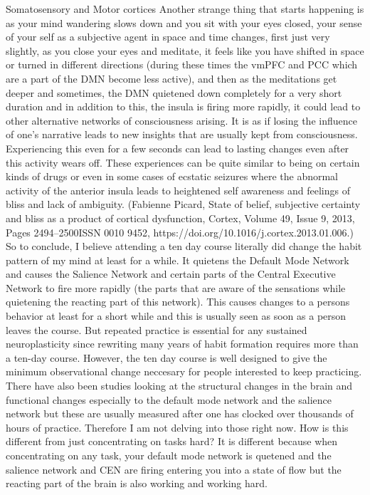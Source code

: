 \documentclass{article}
\begin{document}
Somatosensory and Motor cortices
Another strange thing that starts happening is as your mind wandering slows down and you sit with your eyes closed, your sense of your self as a subjective agent in space and time changes, first just very slightly, as you close your eyes and meditate, it feels like you have shifted in space or turned in different directions (during these times the vmPFC and PCC which are a part of the DMN become less active), and then as the meditations get deeper and sometimes, the DMN quietened down completely for a very short duration and in addition to this, the insula is firing more rapidly, it could lead to other alternative networks of consciousness arising. It is as if losing the influence of one’s narrative leads to new insights that are usually kept from consciousness. Experiencing this even for a few seconds can lead to lasting changes even after this activity wears off. These experiences can be quite similar to being on certain kinds of drugs or even in some cases of ecstatic seizures where the abnormal activity of the anterior insula leads to heightened self awareness and feelings of bliss and lack of ambiguity. (Fabienne Picard, State of belief, subjective certainty and bliss as a product of cortical dysfunction, Cortex, Volume 49, Issue 9, 2013,
Pages 2494–2500ISSN 0010 9452, https://doi.org/10.1016/j.cortex.2013.01.006.)
So to conclude, I believe attending a ten day course literally did change the habit pattern of my mind at least for a while.
It quietens the Default Mode Network and causes the Salience Network and certain parts of the Central Executive Network to fire more rapidly (the parts that are aware of the sensations while quietening the reacting part of this network). This causes changes to a persons behavior at least for a short while and this is usually seen as soon as a person leaves the course. But repeated practice is essential for any sustained neuroplasticity since rewriting many years of habit formation requires more than a ten-day course. However, the ten day course is well designed to give the minimum observational change neccesary for people interested to keep practicing.
There have also been studies looking at the structural changes in the brain and functional changes especially to the default mode network and the salience network but these are usually measured after one has clocked over thousands of hours of practice. Therefore I am not delving into those right now.
How is this different from just concentrating on tasks hard? It is different because when concentrating on any task, your default mode network is quetened and the salience network and CEN are firing entering you into a state of flow but the reacting part of the brain is also working and working hard.
\end{document}
